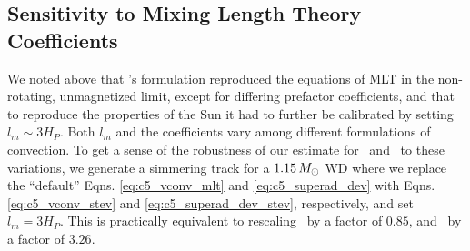 


\subsection{Sensitivity to Mixing Length Theory Coefficients}
\label{ssec:c5_sensitive_apdx}

We noted above that \citeal{stev79}'s formulation reproduced the equations of MLT in the non-rotating, unmagnetized limit, except for differing prefactor coefficients, and that to reproduce the properties of the Sun it had to further be calibrated by setting $l_m \sim 3H_P$.  Both $l_m$ and the coefficients vary among different formulations of convection.  To get a sense of the robustness of our estimate for \Mcrit\ and \MNi\ to these variations, we generate a simmering track for a $1.15\,\Msun$ WD where we replace the ``default'' Eqns. \ref{eq:c5_vconv_mlt} and \ref{eq:c5_superad_dev} with Eqns. \ref{eq:c5_vconv_stev} and \ref{eq:c5_superad_dev_stev}, respectively, and set $l_m = 3H_P$.  This is practically equivalent to rescaling \vconv\ by a factor of $0.85$, and \dnabconv\ by a factor of $3.26$.

